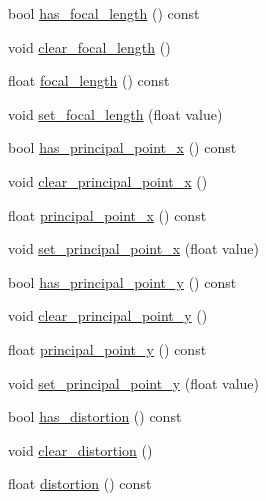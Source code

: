 \begin{DoxyCompactItemize}
\item 
bool \hyperlink{class_s_s_l___geometry_camera_calibration_a3040eb19ea1d2157e7763c1e443f0a72}{has\-\_\-focal\-\_\-length} () const 
\item 
void \hyperlink{class_s_s_l___geometry_camera_calibration_ac9504374541e74c639ed7dace67e5a40}{clear\-\_\-focal\-\_\-length} ()
\item 
float \hyperlink{class_s_s_l___geometry_camera_calibration_a3b2dabb74fdc11b2dcde63d72723dd1a}{focal\-\_\-length} () const 
\item 
void \hyperlink{class_s_s_l___geometry_camera_calibration_a9ae5272ae4d169a441f6689cd288d80f}{set\-\_\-focal\-\_\-length} (float value)
\item 
bool \hyperlink{class_s_s_l___geometry_camera_calibration_a2f97c94ebc54ca221e8893a42799095c}{has\-\_\-principal\-\_\-point\-\_\-x} () const 
\item 
void \hyperlink{class_s_s_l___geometry_camera_calibration_a166ee1017b8fa7f240327f3856e3bea4}{clear\-\_\-principal\-\_\-point\-\_\-x} ()
\item 
float \hyperlink{class_s_s_l___geometry_camera_calibration_a7175ec36344c69d2ad0aaee0931ccbe9}{principal\-\_\-point\-\_\-x} () const 
\item 
void \hyperlink{class_s_s_l___geometry_camera_calibration_a370c342e7b0dc2c7abd7e4fb0cf7ea08}{set\-\_\-principal\-\_\-point\-\_\-x} (float value)
\item 
bool \hyperlink{class_s_s_l___geometry_camera_calibration_aa69323b324335de72fcc816175c32840}{has\-\_\-principal\-\_\-point\-\_\-y} () const 
\item 
void \hyperlink{class_s_s_l___geometry_camera_calibration_ab8f0cf82779619a55fa0860b6700d3ec}{clear\-\_\-principal\-\_\-point\-\_\-y} ()
\item 
float \hyperlink{class_s_s_l___geometry_camera_calibration_a0f850a4992b79d88076db0353c04417f}{principal\-\_\-point\-\_\-y} () const 
\item 
void \hyperlink{class_s_s_l___geometry_camera_calibration_a3d630c39b4a93425952dda1c49b7be88}{set\-\_\-principal\-\_\-point\-\_\-y} (float value)
\item 
bool \hyperlink{class_s_s_l___geometry_camera_calibration_a2e33d6a4ae7c4e0ccf1bcbbb665035fa}{has\-\_\-distortion} () const 
\item 
void \hyperlink{class_s_s_l___geometry_camera_calibration_a35d56eab45d873b3ca0cbccbfa1a49f4}{clear\-\_\-distortion} ()
\item 
float \hyperlink{class_s_s_l___geometry_camera_calibration_af360499b7f602939a88d3d145ebf3d3f}{distortion} () const 

\end{DoxyCompactItemize}
